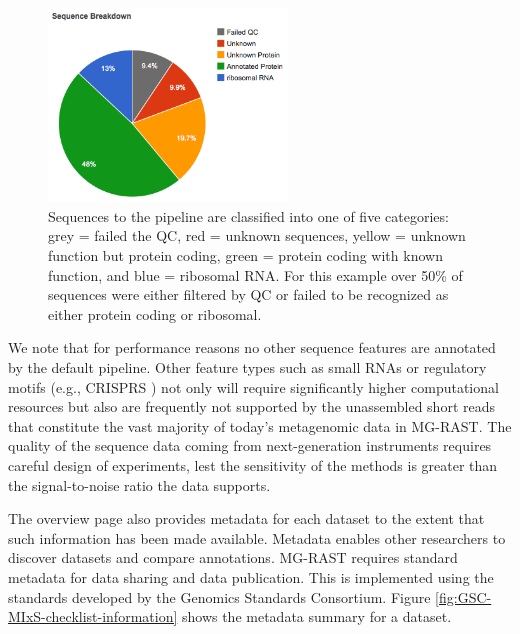 \documentclass[12pt,fullpage]{report}
\begin{document}
\begin{figure}
\begin{center}
\includegraphics[width=2.5in]{Images/classification-pie-chart.png}
\end{center}
\caption{
Sequences to the pipeline are classified into one of five categories: grey = failed the QC, red = unknown sequences, yellow = unknown function but protein coding, green = protein coding with known function, and blue = ribosomal RNA. For this example over 50\% of sequences were either filtered by QC or failed to be recognized as either protein coding or ribosomal.
}
\label{fig:classification-pie-chart}
\end{figure}

We note that for performance reasons no other sequence features are annotated by the default pipeline. Other feature types such as small RNAs or regulatory motifs (e.g., CRISPRS \cite{CRISPRS}) not only will require significantly higher computational resources but also are frequently not supported by the unassembled short reads that constitute the vast majority of today’s metagenomic data in MG-RAST. The quality of the sequence data coming from next-generation instruments requires careful design of experiments, lest the sensitivity of the methods is greater than the signal-to-noise ratio the data supports.

The overview page also provides metadata for each dataset to the extent that such information has been made available. Metadata enables other researchers to discover datasets and compare annotations. MG-RAST requires standard metadata for data sharing and data publication. This is implemented using the standards developed by the Genomics Standards Consortium. Figure \ref{fig:GSC-MIxS-checklist-information} shows the metadata summary for a dataset.
\end{document}
